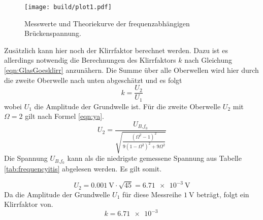\begin{figure}
    \centering
    \texttt{[image: build/plot1.pdf]}
    \caption{Messwerte und Theoriekurve der frequenzabhängigen Brückenspannung.} 
    \label{fig:plot1}
\end{figure}
Zusätzlich kann hier noch der Klirrfaktor berechnet werden. Dazu ist es allerdings notwendig die Berechnungen des Klirrfaktors $k$ nach Gleichung \eqref{eqn:GlasGoesklirr} anzunähern. 
Die Summe über alle Oberwellen wird hier durch die zweite Oberwelle nach unten abgeschätzt und es folgt
\begin{equation}
k = \frac{U_{2}}{U_{1}}
\end{equation}
wobei $U_{1}$ die Amplitude der Grundwelle ist. Für die zweite Oberwelle $U_{2}$ mit $\Omega = 2$ gilt nach Formel \eqref{eqn:ya}.
\begin{equation*}
U_{2} = \frac{U_{B\text{,}{f_{0}}  }}{\sqrt{\frac{(\Omega^2 - 1)^{2}}{9(1- \Omega^2)^{2} + 9 \Omega^2}}} 
\end{equation*}
Die Spannung $U_{B\text{,}{f_{0}}}$ kann als die niedrigste gemessene Spannung aus Tabelle \ref{tab:frequencyitis} abgelesen werden. Es gilt somit.

\begin{equation*}
    U_{2} = \SI{0.001}{\volt} \cdot \sqrt{45} = \SI{6.71e-3}{\volt}
\end{equation*}
Da die Amplitude der Grundwelle $U_{1}$ für diese Messreihe $\SI{1}{\volt}$ beträgt, folgt ein Klirrfaktor von.
\begin{equation}
k = \SI{6.71e-3}{}
\end{equation}